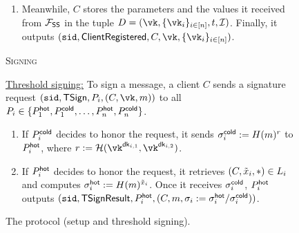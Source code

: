 \begin{figure*}
\begin{mdframed}
\begin{enumerate}
            \item Meanwhile, $C$ stores the parameters and the values it received from $\mathcal{F}_\mathsf{SS}$ in the tuple $\clientlist = (\vk, \{\vk_i\}_{i \in [n]}, t, \mathcal{I})$. Finally, it outputs $(\sid, \mathsf{ClientRegistered}, C, \vk, \{\vk_i\}_{i \in [n]})$.
        \end{enumerate}
        \begin{center}
            \textsc{Signing}
        \end{center}
        \underline{Threshold signing:} To sign a message, a client $C$ sends a signature request $(\sid, \mathsf{TSign}, P_i, (C, \vk, m))$ to all $P_i \in \{P_1^{\mathsf{hot}},P_1^{\mathsf{cold}},\dots,P_n^{\mathsf{hot}},P_n^{\mathsf{cold}}\}$.
        \begin{enumerate}
            \item If $P_i^{\mathsf{cold}}$ decides to honor the request, it 
            sends $\sigma_i^{\mathsf{cold}} := H(m)^r$ 
            to $P_i^{\mathsf{hot}}$,
            where $r := \lhlhash(\vk^{\dk_{i,1}}, \vk^{\dk_{i,2}})$.
            \item If $P_i^{\mathsf{hot}}$ decides to honor the request, 
            it retrieves $(C, \tilde{x}_i, *) \in L_i$ and computes $\sigma_i^{\mathsf{hot}} := H(m)^{\tilde{x}_i}$.
            Once it receives 
            $\sigma_i^{\mathsf{cold}}$, $P_i^{\mathsf{hot}}$ outputs $(\texttt{sid}, \mathsf{TSignResult}, P_i^{\mathsf{hot}}, (C, m, \sigma_i := \sigma_i^{\mathsf{hot}}/\sigma_i^{\mathsf{cold}}))$.
        \end{enumerate}
        \end{mdframed}
        \caption{The \sysname protocol (setup and threshold signing).}
        \label{fig:hc_bls1}
    \end{figure*}